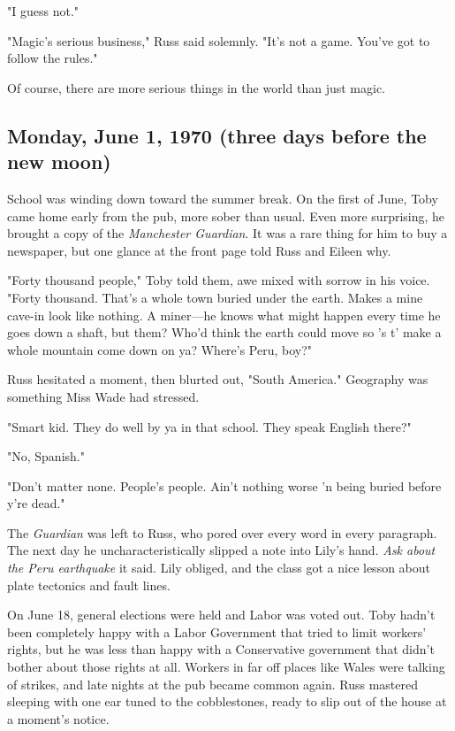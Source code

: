 "I guess not."

"Magic's serious business," Russ said solemnly. "It's not a game. You've got to follow the rules."

Of course, there are more serious things in the world than just magic.

\subsection{Monday, June 1, 1970 (three days before the new moon)}

School was winding down toward the summer break. On the first of June, Toby came home early from the pub, more sober than usual. Even more surprising, he brought a copy of the \emph{Manchester Guardian}. It was a rare thing for him to buy a newspaper, but one glance at the front page told Russ and Eileen why.

"Forty thousand people," Toby told them, awe mixed with sorrow in his voice. "Forty thousand. That's a whole town buried under the earth. Makes a mine cave-in look like nothing. A miner—he knows what might happen every time he goes down a shaft, but them? Who'd think the earth could move so 's t' make a whole mountain come down on ya? Where's Peru, boy?"

Russ hesitated a moment, then blurted out, "South America." Geography was something Miss Wade had stressed.

"Smart kid. They do well by ya in that school. They speak English there?"

"No, Spanish."

"Don't matter none. People's people. Ain't nothing worse 'n being buried before y're dead."

The \emph{Guardian} was left to Russ, who pored over every word in every paragraph. The next day he uncharacteristically slipped a note into Lily's hand. \emph{Ask about the Peru earthquake} it said. Lily obliged, and the class got a nice lesson about plate tectonics and fault lines.

On June 18, general elections were held and Labor was voted out. Toby hadn't been completely happy with a Labor Government that tried to limit workers' rights, but he was less than happy with a Conservative government that didn't bother about those rights at all. Workers in far off places like Wales were talking of strikes, and late nights at the pub became common again. Russ mastered sleeping with one ear tuned to the cobblestones, ready to slip out of the house at a moment's notice.

